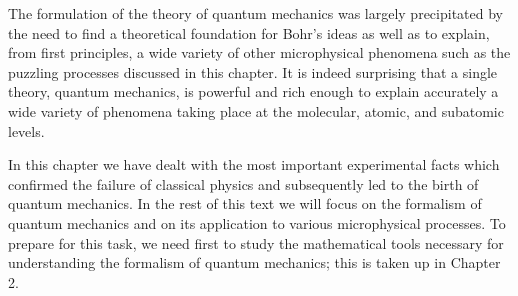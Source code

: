 \documentclass[10pt]{article}
\begin{document}
The formulation of the theory of quantum mechanics was largely precipitated by the need to find a theoretical foundation for Bohr's ideas as well as to explain, from first principles, a wide variety of other microphysical phenomena such as the puzzling processes discussed in this chapter. It is indeed surprising that a single theory, quantum mechanics, is powerful and rich enough to explain accurately a wide variety of phenomena taking place at the molecular, atomic, and subatomic levels.

In this chapter we have dealt with the most important experimental facts which confirmed the failure of classical physics and subsequently led to the birth of quantum mechanics. In the rest of this text we will focus on the formalism of quantum mechanics and on its application to various microphysical processes. To prepare for this task, we need first to study the mathematical tools necessary for understanding the formalism of quantum mechanics; this is taken up in Chapter 2.
\end{document}
